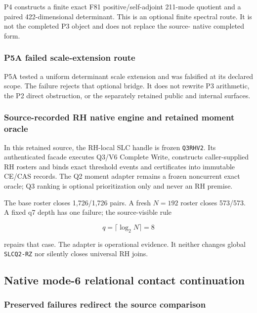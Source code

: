 P4 constructs a finite exact F81 positive/self-adjoint 211-mode quotient
and a paired 422-dimensional determinant. This is an optional finite
spectral route. It is not the completed P3 object and does not replace
the source- native completed form.

\subsubsection{P5A failed scale-extension
route}\label{viii-ch09-p5a-failed-scale-extension-route}

P5A tested a uniform determinant scale extension and was falsified at
its declared scope. The failure rejects that optional bridge. It does
not rewrite P3 arithmetic, the P2 direct obstruction, or the separately
retained public and internal surfaces.

\subsubsection{Source-recorded RH native engine and retained moment
oracle}\label{viii-ch09-source-recorded-rh-native-engine-and-retained-moment-oracle}

In this retained source, the RH-local SLC handle is frozen
\texttt{Q3RHV2}. Its authenticated facade executes Q3/V6 Complete Write,
constructs caller-supplied RH rosters and binds exact threshold events
and certificates into immutable CE/CAS records. The Q2 moment adapter
remains a frozen noncurrent exact oracle; Q3 ranking is optional
prioritization only and never an RH premise.

The base roster closes 1,726/1,726 pairs. A fresh \(N=192\) roster
closes 573/573. A fixed q7 depth has one failure; the source-visible
rule

\[
q=\lceil\log_2N\rceil=8
\]

repairs that case. The adapter is operational evidence. It neither
changes global \texttt{SLCQ2-RZ} nor silently closes universal RH joins.

\subsection{Native mode-6 relational contact
continuation}\label{viii-ch09-native-mode-6-relational-contact-continuation}

\subsubsection{Preserved failures redirect the source
comparison}\label{viii-ch09-preserved-failures-redirect-the-source-comparison}

